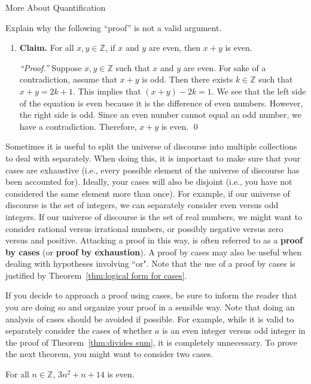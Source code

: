 \begin{section}{More About Quantification}
\begin{problem}
Explain why the following ``proof'' is not a valid argument.
\begin{enumerate}
\item[] \textbf{Claim.}  For all $x,y\in \mathbb{Z}$, if $x$ and $y$ are even, then $x+y$ is even.

\bigskip

\emph{``Proof.''}  Suppose $x, y \in \mathbb{Z}$ such that $x$ and $y$ are even.  For sake of a contradiction, assume that $x+y$ is odd.  Then there exists $k \in \mathbb{Z}$ such that $x+y=2k+1$.  This implies that $(x+y)-2k=1$.  We see that the left side of the equation is even because it is the difference of even numbers.  However, the right side is odd.  Since an even number cannot equal an odd number, we have a contradiction.  Therefore, $x+y$ is even.  \qed %
\end{enumerate}
\end{problem}

Sometimes it is useful to split the universe of discourse into multiple collections to deal with separately.  When doing this, it is important to make sure that your cases are exhaustive (i.e., every possible element of the universe of discourse has been accounted for).  Ideally, your cases will also be disjoint (i.e., you have not considered the same element more than once).  For example, if our universe of discourse is the set of integers, we can separately consider even versus odd integers. If our universe of discourse is the set of real numbers, we might want to consider rational versus irrational numbers, or possibly negative versus zero versus and positive. Attacking a proof in this way, is often referred to as a \textbf{proof by cases} (or \textbf{proof by exhaustion}). A proof by cases may also be useful when dealing with hypotheses involving ``or".  Note that the use of a proof by cases is justified by Theorem~\ref{thm:logical form for cases}.

If you decide to approach a proof using cases, be sure to inform the reader that you are doing so and organize your proof in a sensible way. Note that doing an analysis of cases should be avoided if possible. For example, while it is valid to separately consider the cases of whether $a$ is an even integer versus odd integer in the proof of Theorem~\ref{thm:divides sum}, it is completely unnecessary.  To prove the next theorem, you might want to consider two cases.

\begin{theorem}\label{thm:3n^2+n+14 is even}
For all $n\in \mathbb{Z}$, $3n^2+n+14$ is even.
\end{theorem}


\end{section}
